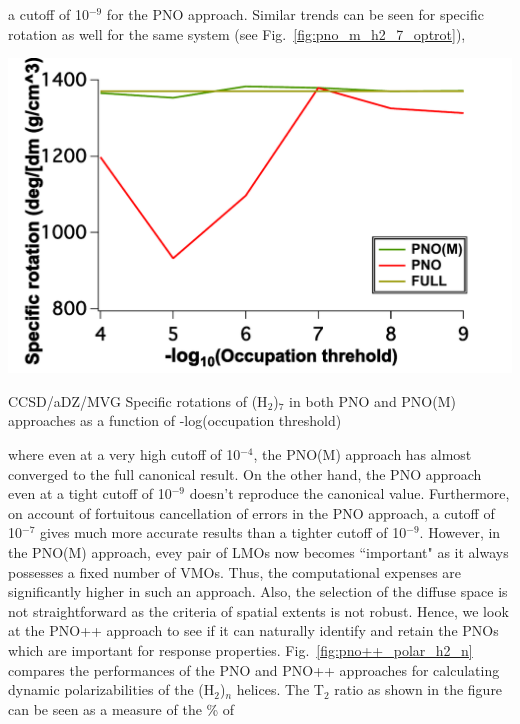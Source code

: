 a cutoff of 10$^{-9}$ for the PNO approach. Similar trends can be seen for specific rotation as well
for the same system (see Fig.~\ref{fig:pno_m_h2_7_optrot}),
\begin{MyFigure}[h!]
\centering
\includegraphics[width=0.6\linewidth,natwidth=610,natheight=642]{figures_pno++/pno_m_h2_7_adz_optrot.pdf}
\caption{{\footnotesize CCSD/aDZ/MVG Specific rotations of (H$_2$)$_7$ in both PNO and PNO(M) approaches
as a function of -log(occupation threshold)}}
\label{fig:pno_m_h2_7_optrot}
\end{MyFigure}
where even at a very high cutoff of 10$^{-4}$, the PNO(M) approach has almost converged to the full 
canonical result. On the other hand, the PNO approach even at a tight cutoff of 10$^{-9}$ doesn't
reproduce the canonical value. Furthermore, on account of fortuitous cancellation of errors in the
PNO approach, a cutoff of 10$^{-7}$ gives much more accurate results than a tighter cutoff of 10$^{-9}$.
However, in the PNO(M) approach, evey pair of LMOs now becomes ``important" as it always possesses 
a fixed number of VMOs. Thus, the computational expenses are significantly higher in such an
approach. Also, the selection of the diffuse space is not straightforward as the criteria of 
spatial extents is not robust. Hence, we look at the PNO++ approach to see if it can naturally
identify and retain the PNOs which are important for response properties.
Fig.~\ref{fig:pno++_polar_h2_n} compares the performances of the PNO and PNO++
approaches for calculating dynamic polarizabilities of the (H$_2$)$_n$ helices.
The T$_2$ ratio as shown in the figure can be seen as a measure of the \% of 
